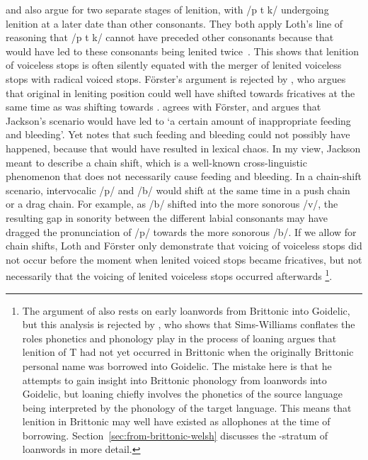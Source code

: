 \Textcite[162]{Foer_Flussname41} and \Textcite{sims-williams_dating_1990} also argue for two separate stages of lenition, with /p t k/ undergoing lenition at a later date than other consonants.
They both apply Loth's line of reasoning that /p t k/ cannot have preceded other consonants because that would have led to these consonants being lenited twice~\autocite[\eg][232]{sims-williams_dating_1990}. This shows that lenition of voiceless stops is often silently equated with the merger of lenited voiceless stops with radical voiced stops. Förster's argument is rejected by \textcite[§~131]{jackson_language_1953}, who argues that original  in leniting position could well have shifted towards fricatives at the same time as  was shifting towards . \Textcite[5]{Tho_Brythonic90} agrees with Förster, and argues that Jackson's scenario would have led to `a certain amount of inappropriate feeding and bleeding'. Yet \textcite[243]{Rus_Introduction95} notes that such feeding and bleeding could not possibly have happened, because that would have resulted in lexical chaos. In my view, Jackson meant to describe a chain shift, which is a well-known cross-linguistic phenomenon that does not necessarily cause feeding and bleeding. In a chain-shift scenario, intervocalic /p/ and /b/ would shift at the same time in a push chain or a drag chain. For example, as /b/ shifted into the more sonorous /v/, the resulting gap in sonority between the different labial consonants may have dragged the pronunciation of /p/ towards the more sonorous /b/. If we allow for chain shifts, Loth and Förster only demonstrate that voicing of voiceless stops did not occur before the moment when lenited voiced stops became fricatives, but not necessarily that the voicing of lenited voiceless stops occurred afterwards%
\footnote{The argument of \textcite{sims-williams_dating_1990} also rests on early loanwords from Brittonic into Goidelic, but this analysis is rejected by \textcite{isaac_chronology_2004}, who shows that Sims-Williams conflates the roles  phonetics and phonology play in the process of loaning argues that lenition of \gls{T} had not yet occurred in Brittonic when the originally Brittonic personal name  was borrowed into Goidelic.  The mistake here is that he attempts to gain insight into Brittonic phonology from loanwords into Goidelic, but loaning chiefly involves the phonetics of the source language being interpreted by the phonology of the target language. This means that lenition in Brittonic may well have existed as allophones at the time of borrowing. Section~\ref{sec:from-brittonic-welsh} discusses the -stratum of loanwords in more detail.}.


